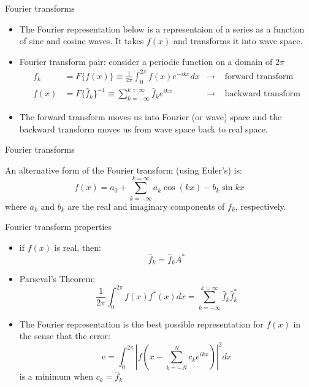 \begin{frame}{Fourier transforms}

\begin{itemize}
	\item The Fourier representation below is a representaion of a series as a function of sine and cosine waves. It takes $f(x)$ and transforms it into wave space.
	\item Fourier transform pair: consider a periodic function on a domain of $2\pi$
	\begin{align*}
		f_k &= F\{f(x)\} \equiv \frac{1}{2\pi} \int^{2\pi}_{0} f(x) e^{-ikx}dx &\rightarrow & \text{ forward transform}\\
		f(x) &= F\{\hat f_k\}^{-1} \equiv \sum^{k=\infty}_{k=-\infty} \hat f_k e^{ikx} &\rightarrow & \text{ backward transform}
	\end{align*}
	\item The forward transform moves us into Fourier (or wave) space and the backward transform moves us from wave space back to real space.
	\end{itemize}
\end{frame}


\begin{frame}{Fourier transforms}

An alternative form of the Fourier transform (using Euler's) is:
$$f(x) = a_0 + \sum^{k=\infty}_{k=-\infty} a_k\cos(kx) - b_k\sin{kx}$$
where $a_k$ and $b_k$ are the real and imaginary components of $f_k$, respectively.

\end{frame}

\begin{frame}{Fourier transform properties}

\begin{itemize}
	\item if $f(x)$ is real, then: $$\hat f_k = \hat f_kA^*$$
	\item Parseval's Theorem: $$\frac{1}{2\pi} \int^{2\pi}_{0} f(x) f^*(x)dx = \sum^{k=\infty}_{k=-\infty} \hat f_k \hat f_k^*$$
	\item The Fourier representation is the best possible representation for $f(x)$ in the sense that the error:
	$$\text{e} = \int^{2\pi}_{0} \left| f\left(x - \sum^N_{k=-N} c_k e^{ikx}\right)\right|^2 dx$$
	is a minimum when $c_k = \hat f_k$
\end{itemize}

\end{frame}

